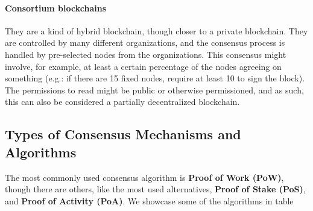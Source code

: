     \paragraph{Consortium blockchains} They are a kind of hybrid blockchain, though closer to a private blockchain. They are controlled by many different organizations, and the consensus process is handled by pre-selected nodes from the organizations. This consensus might involve, for example, at least a certain percentage of the nodes agreeing on something (e.g.: if there are 15 fixed nodes, require at least 10 to sign the block). The permissions to read might be public or otherwise permissioned, and as such, this can also be considered a partially decentralized blockchain.

    \subsection{Types of Consensus Mechanisms and Algorithms}
    
     The most commonly used consensus algorithm is \textbf{Proof of Work (PoW)}, though there are others, like the most used alternatives, \textbf{Proof of Stake (PoS)}, and \textbf{Proof of Activity (PoA)}. We showcase some of the algorithms in table %
    
